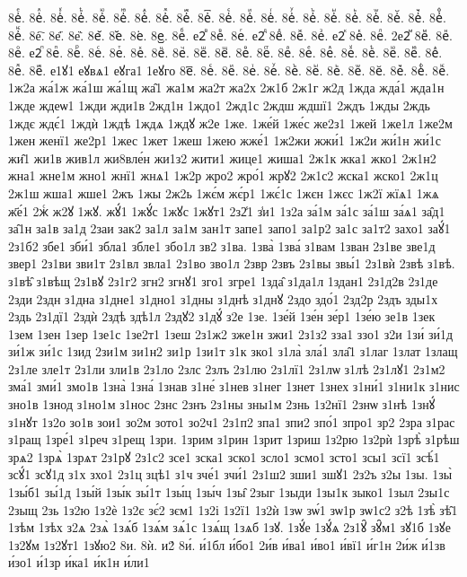 {8е҆ⷷ.
8е҆ⷸ.
8е҆ⷹ.
8е҆ⷺ.
8е҆ⷻ.
8е҆ⷼ.
8е҆ⷽ.
8е҆ⷾ.
8е҆ⷿ.
8е҆꙯.
8е҆ꙴ.
8е҆ꙵ.
8е҆ꙶ.
8е҆ꙷ.
8е҆ꙸ.
8е҆ꙹ.
8е҆ꙺ.
8е҆ꙻ.
8е҆꙼.
8е҆꙽.
8е҆ꚞ.
8е҆ꚟ.
8е҇.
8е᷀.
8е᷁.
8е᷶.
8е᷷.
8е᷸.
8е᷹.
8еⷠ.
е2ⷡ
8еⷡ.
8еⷢ.
е2ⷣ
8еⷣ.
8еⷤ.
8еⷥ.
е2ⷦ
8еⷦ.
8еⷧ.
2е2ⷨ
8еⷨ.
8еⷩ.
8еⷪ.
е2ⷫ
8еⷫ.
8еⷬ.
8еⷭ.
8еⷮ.
8еⷯ.
8еⷰ.
8еⷱ.
8еⷲ.
8еⷳ.
8еⷴ.
8еⷵ.
8еⷶ.
8еⷷ.
8еⷸ.
8еⷹ.
8еⷺ.
8еⷻ.
8еⷼ.
8еⷽ.
8еⷾ.
8еⷿ.
е1ꙋ1
еꙋвѧ1
еꙋга1
1еꙋго
8е꙯.
8еꙴ.
8еꙵ.
8еꙶ.
8еꙷ.
8еꙸ.
8еꙹ.
8еꙺ.
8еꙻ.
8е꙼.
8е꙽.
8еꚞ.
8еꚟ.
1ж2а
жа́1ж
жа́1ш
жа́1щ
жа̑1
жа1м
жа2т
жа2х
2ж1б
2ж1г
ж2д
1жда
жда́1
жда1н
1жде
ждеѡ1
1жди
жди1в
2жд1н
1ждо1
2жд1с
2ждш
ждшї1
2ждъ
1жды
2ждь
1ждє
ждє́1
1ждѝ
1ждѣ
1ждѧ
1ждꙋ
ж2е
1же.
1же́й
1же́с
же2з1
1жей
1же1л
1же2м
1жен
женї1
же2р1
1жес
1жет
1жеш
1жею
жже́1
1ж2жи
жжи́1
1ж2и
жи́1н
жи́1с
жи̑1
жи1в
жив1л
жи8вле́н
жи1з2
жити1
жице1
жиша1
2ж1к
жка1
жко1
2ж1н2
жна1
жне1м
жно1
жнї1
жнѧ1
1ж2р
жро2
жро́1
жрꙋ2
2ж1с2
жска1
жско1
2ж1ц
2ж1ш
жша1
жше1
2жъ
1жы
2ж2ь
1жє́м
жє́р1
1жє́1с
1жєн
1жєс
1ж2ї
жїѧ1
1жѧ
ж҃е́1
2жⷭ
ж2ꙋ
1жꙋ.
жꙋ́1
1жꙋ́с
1жꙋс
1жꙋт1
2з2̾1
з̾и1
1з2а
за́1м
за́1с
за́1ш
за́ѧ1
за̑д1
за̑1н
за1в
за1д
2заи
зак2
за1л
за1м
зан1т
запе1
запо1
за1р2
за1с
за1т2
захо1
заꙋ́1
2з1б2
збе1
зби́1
збла1
збле1
збо1л
зв2
з1ва.
1зва̀
1зва́
з1вам
1зван
2з1ве
зве1д
звер1
2з1ви
зви1т
2з1вл
звла1
2з1во
зво1л
2звр
2звъ
2з1вы
звы́1
2з1вѝ
2звѣ
з1вѣ.
з1вѣ̑
з1вѣщ
2з1вꙋ
2з1г2
згн2
згнꙋ1
зго1
згре1
1зда̑
з1да1л
1здан1
2з1д2в
2з1де
2зди
2здн
з1дна
з1дне1
з1дно1
з1дны
з1днѣ
з1днꙋ
2здо
здо́1
2зд2р
2здъ
зды1х
2здь
2з1дї1
2здѝ
2здѣ
здѣ1л
2здꙋ2
з1дꙋ́
з2е
1зе.
1зе́й
1зе́н
зе́р1
1зе́ю
зе1в
1зек
1зем
1зен
1зер
1зе1с
1зе2т1
1зеш
2з1ж2
зже1н
зжи1
2з1з2
зза1
ззо1
з2и
1зи́
зи́1д
зи́1ж
зи́1с
1зид
2зи1м
зи1н2
зи1р
1зи1т
з1к
зко1
з1ла̀
зла́1
зла̑1
з1лаг
1злат
1злащ
2з1ле
зле1т
2з1ли
зли1в
2з1ло
2злс
2злъ
2з1лю
2з1лї1
2з1лѡ
з1лѣ
2з1лꙋ1
2з1м2
зма́1
зми́1
змо1в
1зна̀
1зна́
1знав
з1не́
з1нев
з1нег
1знет
1знех
з1ни́1
з1ни1к
з1нис
зно1в
1знод
з1но1м
з1нос
2знс
2знъ
2з1ны
зны1м
2знь
1з2нї1
2знѡ
з1нѣ
1знꙋ́
з1нꙋт
1з2о
зо1в
зои1
зо2м
зото1
зо2ч1
2з1п2
зпа1
зпи2
зпо́1
зпро1
зр2
2зра
з1рас
з1ращ
1зре́1
з1реч
з1рещ
1зри.
1зрим
з1рин
1зрит
1зриш
1з2рю
1з2рѝ
1зрѣ̀
з1рѣш
зрѧ2
1зрѧ̀
1зрѧт
2з1рꙋ
2з1с2
зсе1
зска1
зско1
зсло1
зсмо1
зсто1
зсы1
зсї1
зсѣ́1
зсꙋ́1
зсꙋ1д
з1х
зхо1
2з1ц
зцѣ1
з1ч
зче́1
зчи́1
2з1ш2
зши1
зшꙋ1
2з2ъ
з2ы
1зы.
1зы̀
1зы́б1
зы́1д
1зы́й
1зы́к
зы́1т
1зы́ц
1зы́ч
1зы̑
2зыг
1зыди
1зы1к
зыко1
1зыл
2зы1с
2зыщ
2зь
1з2ю
1з2ѐ
1з2є
зє́2
зєм1
1з2і
1з2ї1
1з2ѝ
1зѡ
зѡ́1
зѡ1р
зѡ1с2
з2ѣ
1зѣ̀
зѣ̑1
1зѣм
1зѣх
з2ѧ
2зѧ̀
1зѧ́б
1зѧ́м
зѧ́1с
1зѧ́щ
1зѧб
1зꙋ.
1зꙋ́е
1зꙋ́ѧ
2з1ꙋ̑
зꙋ̑м1
зꙋ1б
1зꙋе
1з2ꙋм
1з2ꙋт1
1зꙋю2
8и.
8ѝ.
и2́
8и́.
и́1бл
и́бо1
2и́в
и́ва1
и́во1
и́вї1
и́г1н
2и́ж
и́1зв
и́зо1
и́1зр
и́ка1
и́к1н
и́ли1
}
